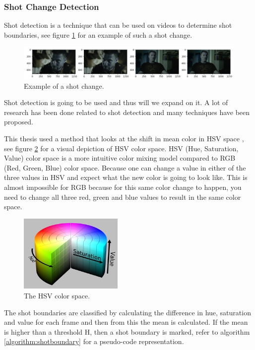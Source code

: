 \documentclass{article}
\begin{document}
\subsubsection{Shot Change Detection}

Shot detection is a technique that can be used on videos to determine shot boundaries, see figure \ref{shotchange} for an example of such a shot change. 

\begin{figure}[H]
	\includegraphics[width=12cm]{images/shotchange.jpg}
	\centering
	\caption{Example of a shot change.}
	\label{shotchange}
\end{figure}

Shot detection is going to be used and thus will we expand on it. A lot of research has been done related to shot detection \cite{lienhart1998comparison} and many techniques have been proposed. 

This thesis used a method that looks at the shift in mean color in HSV space \cite{shao2015shot}, see figure \ref{hsvspace} for a visual depiction of HSV color space. HSV (Hue, Saturation, Value) color space is a more intuitive color mixing model compared to RGB (Red, Green, Blue) color space. Because one can change a value in either of the three values in HSV and expect what the new color is going to look like. This is almost impossible for RGB because for this same color change to happen, you need to change all three red, green and blue values to result in the same color space.

\begin{figure}[H]
	\includegraphics[width=5cm]{images/hsv.png}
	\centering
	\caption{The HSV color space.}
	\label{hsvspace}
\end{figure}

The shot boundaries are classified by calculating the difference in hue, saturation and value for each frame and then from this the mean is calculated. If the mean is higher than a threshold H, then a shot boundary is marked, refer to algorithm \ref{algorithm:shotboundary} for a pseudo-code representation.
\end{document}
